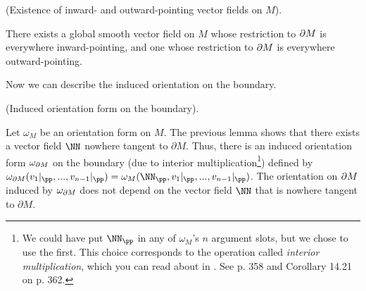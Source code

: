 \begin{lemma}
     (Existence of inward- and outward-pointing vector fields on $M$).
    
    There exists a global smooth vector field on $M$ whose restriction to $\partial M$ is everywhere inward-pointing, and one whose restriction to $\partial M$ is everywhere outward-pointing.
\end{lemma}

Now we can describe the induced orientation on the boundary.

\begin{theorem}
\label{ch::manifolds::induced_orientation_form_on_bdy}
     (Induced orientation form on the boundary).

    Let $\omega_M$ be an orientation form on $M$. The previous lemma shows that there exists a vector field $\NN$ nowhere tangent to $\partial M$. Thus, there is an induced orientation form $\omega_{\partial M}$ on the boundary (due to interior multiplication\footnote{We could have put $\NN_\pp$ in any of $\omega_M$'s $n$ argument slots, but we chose to use the first. This choice corresponds to the operation called \textit{interior multiplication}, which you can read about in \cite{book::SM}. See p. 358 and Corollary 14.21 on p. 362.}) defined by $\omega_{\pd M}(v_1|_\pp, ..., v_{n - 1}|_\pp) = \omega_M(\NN_\pp, v_1|_\pp, ..., v_{n - 1}|_\pp)$. The orientation on $\partial M$ induced by $\omega_{\partial M}$ does not depend on the vector field $\NN$ that is nowhere tangent to $\partial M$. 
\end{theorem}

